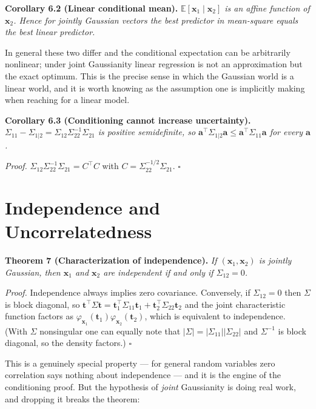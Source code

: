 \documentclass[conference]{IEEEtran}
\begin{document}
\medskip
\noindent\textbf{Corollary 6.2 (Linear conditional mean).}
\textit{$\mathbb{E}[\mathbf{x}_1 \mid \mathbf{x}_2]$ is an affine function of $\mathbf{x}_2$. Hence for jointly Gaussian vectors the best predictor in mean-square equals the best \textit{linear} predictor.}

\medskip
In general these two differ and the conditional expectation can be arbitrarily nonlinear; under joint Gaussianity linear regression is not an approximation but the exact optimum. This is the precise sense in which the Gaussian world is a linear world, and it is worth knowing as the assumption one is implicitly making when reaching for a linear model.

\medskip
\noindent\textbf{Corollary 6.3 (Conditioning cannot increase uncertainty).}
\textit{$\Sigma_{11} - \Sigma_{1|2} = \Sigma_{12}\Sigma_{22}^{-1}\Sigma_{21}$ is positive semidefinite, so $\mathbf{a}^{\!\top}\Sigma_{1|2}\mathbf{a} \leq \mathbf{a}^{\!\top}\Sigma_{11}\mathbf{a}$ for every $\mathbf{a}$.}

\medskip
\textit{Proof.} $\Sigma_{12}\Sigma_{22}^{-1}\Sigma_{21} = C^{\!\top}C$ with $C = \Sigma_{22}^{-1/2}\Sigma_{21}$. $\square$

\section*{Independence and Uncorrelatedness}
\noindent\textbf{Theorem 7 (Characterization of independence).}
\textit{If $(\mathbf{x}_1,\mathbf{x}_2)$ is jointly Gaussian, then $\mathbf{x}_1$ and $\mathbf{x}_2$ are independent if and only if $\Sigma_{12} = 0$.}

\medskip
\textit{Proof.} Independence always implies zero covariance. Conversely, if $\Sigma_{12}=0$ then $\Sigma$ is block diagonal, so $\mathbf{t}^{\!\top}\Sigma\mathbf{t} = \mathbf{t}_1^{\!\top}\Sigma_{11}\mathbf{t}_1 + \mathbf{t}_2^{\!\top}\Sigma_{22}\mathbf{t}_2$ and the joint characteristic function factors as $\varphi_{\mathbf{x}_1}(\mathbf{t}_1)\varphi_{\mathbf{x}_2}(\mathbf{t}_2)$, which is equivalent to independence. (With $\Sigma$ nonsingular one can equally note that $|\Sigma| = |\Sigma_{11}||\Sigma_{22}|$ and $\Sigma^{-1}$ is block diagonal, so the density factors.) $\square$

\medskip
This is a genuinely special property --- for general random variables zero correlation says nothing about independence --- and it is the engine of the conditioning proof. But the hypothesis of \textit{joint} Gaussianity is doing real work, and dropping it breaks the theorem:
\end{document}
